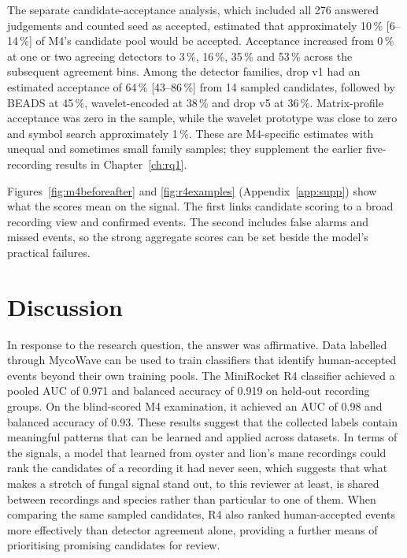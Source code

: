 The separate candidate-acceptance analysis, which included all 276 answered judgements and counted seed as accepted, estimated that approximately 10\,\% [6--14\,\%] of M4's candidate pool would be accepted. Acceptance increased from 0\,\% at one or two agreeing detectors to 3\,\%, 16\,\%, 35\,\% and 53\,\% across the subsequent agreement bins. Among the detector families, drop v1 had an estimated acceptance of 64\,\% [43--86\,\%] from 14 sampled candidates, followed by BEADS at 45\,\%, wavelet-encoded at 38\,\% and drop v5 at 36\,\%. Matrix-profile acceptance was zero in the sample, while the wavelet prototype was close to zero and symbol search approximately 1\,\%. These are M4-specific estimates with unequal and sometimes small family samples; they supplement the earlier five-recording results in Chapter~\ref{ch:rq1}.

Figures~\ref{fig:m4beforeafter} and \ref{fig:r4examples} (Appendix~\ref{app:supp}) show what the scores mean on the signal. The first links candidate scoring to a broad recording view and confirmed events. The second includes false alarms and missed events, so the strong aggregate scores can be set beside the model's practical failures.


\section{Discussion}

In response to the research question, the answer was affirmative. Data labelled through MycoWave can be used to train classifiers that identify human-accepted events beyond their own training pools. The MiniRocket R4 classifier achieved a pooled AUC of 0.971 and balanced accuracy of 0.919 on held-out recording groups. On the blind-scored M4 examination, it achieved an AUC of 0.98 and balanced accuracy of 0.93. These results suggest that the collected labels contain meaningful patterns that can be learned and applied across datasets. In terms of the signals, a model that learned from oyster and lion's mane recordings could rank the candidates of a recording it had never seen, which suggests that what makes a stretch of fungal signal stand out, to this reviewer at least, is shared between recordings and species rather than particular to one of them. When comparing the same sampled candidates, R4 also ranked human-accepted events more effectively than detector agreement alone, providing a further means of prioritising promising candidates for review.

